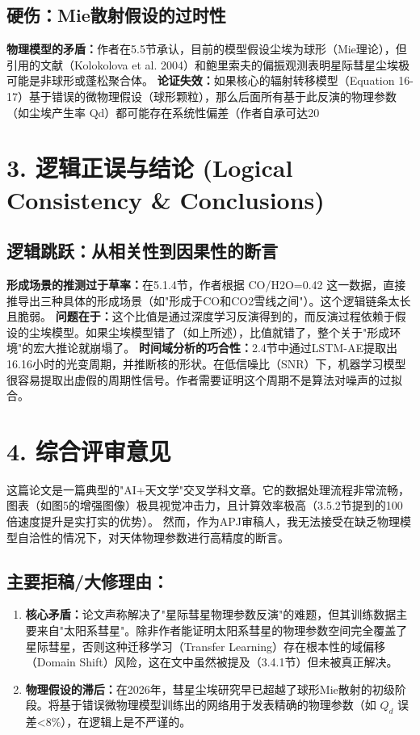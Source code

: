 \documentclass[12pt]{article}
\begin{document}
\subsection{硬伤：Mie散射假设的过时性}
\textbf{物理模型的矛盾：}作者在5.5节承认，目前的模型假设尘埃为球形（Mie理论），但引用的文献（Kolokolova et al. 2004）和鲍里索夫的偏振观测表明星际彗星尘埃极可能是非球形或蓬松聚合体。
\textbf{论证失效：}如果核心的辐射转移模型（Equation 16-17）基于错误的微物理假设（球形颗粒），那么后面所有基于此反演的物理参数（如尘埃产生率  Qd）都可能存在系统性偏差（作者自承可达20%
\section{3. 逻辑正误与结论 (Logical Consistency & Conclusions)}
\subsection{逻辑跳跃：从相关性到因果性的断言}
\textbf{形成场景的推测过于草率：}在5.1.4节，作者根据  CO/H2O=0.42 这一数据，直接推导出三种具体的形成场景（如"形成于CO和CO2雪线之间"）。这个逻辑链条太长且脆弱。
\textbf{问题在于：}这个比值是通过深度学习反演得到的，而反演过程依赖于假设的尘埃模型。如果尘埃模型错了（如上所述），比值就错了，整个关于"形成环境"的宏大推论就崩塌了。
\textbf{时间域分析的巧合性：}2.4节中通过LSTM-AE提取出16.16小时的光变周期，并推断核的形状。在低信噪比（SNR）下，机器学习模型很容易提取出虚假的周期性信号。作者需要证明这个周期不是算法对噪声的过拟合。
\section{4. 综合评审意见}
这篇论文是一篇典型的"AI+天文学"交叉学科文章。它的数据处理流程非常流畅，图表（如图5的增强图像）极具视觉冲击力，且计算效率极高（3.5.2节提到的100倍速度提升是实打实的优势）。
然而，作为APJ审稿人，我无法接受在缺乏物理模型自洽性的情况下，对天体物理参数进行高精度的断言。
\subsection{主要拒稿/大修理由：}
\begin{enumerate}
\item \textbf{核心矛盾：}论文声称解决了"星际彗星物理参数反演"的难题，但其训练数据主要来自"太阳系彗星"。除非作者能证明太阳系彗星的物理参数空间完全覆盖了星际彗星，否则这种迁移学习（Transfer Learning）存在根本性的域偏移（Domain Shift）风险，这在文中虽然被提及（3.4.1节）但未被真正解决。
\item \textbf{物理假设的滞后：}在2026年，彗星尘埃研究早已超越了球形Mie散射的初级阶段。将基于错误微物理模型训练出的网络用于发表精确的物理参数（如 $Q_d$ 误差<8\%），在逻辑上是不严谨的。
\end{enumerate}
\end{document}
